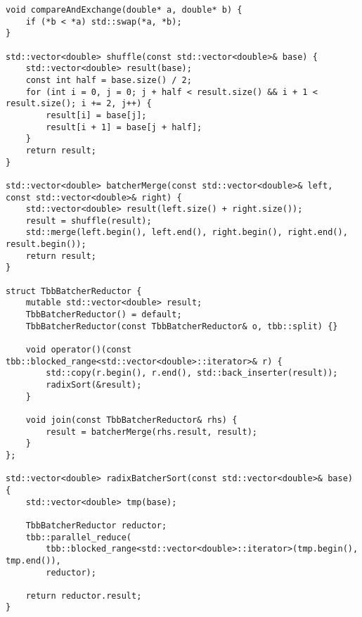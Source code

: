 \documentclass[12pt,a4paper]{article}
\begin{document}
\begin{lstlisting}
void compareAndExchange(double* a, double* b) {
    if (*b < *a) std::swap(*a, *b);
}

std::vector<double> shuffle(const std::vector<double>& base) {
    std::vector<double> result(base);
    const int half = base.size() / 2;
    for (int i = 0, j = 0; j + half < result.size() && i + 1 < result.size(); i += 2, j++) {
        result[i] = base[j];
        result[i + 1] = base[j + half];
    }
    return result;
}

std::vector<double> batcherMerge(const std::vector<double>& left, const std::vector<double>& right) {
    std::vector<double> result(left.size() + right.size());
    result = shuffle(result);
    std::merge(left.begin(), left.end(), right.begin(), right.end(), result.begin());
    return result;
}

struct TbbBatcherReductor {
    mutable std::vector<double> result;
    TbbBatcherReductor() = default;
    TbbBatcherReductor(const TbbBatcherReductor& o, tbb::split) {}

    void operator()(const tbb::blocked_range<std::vector<double>::iterator>& r) {
        std::copy(r.begin(), r.end(), std::back_inserter(result));
        radixSort(&result);
    }

    void join(const TbbBatcherReductor& rhs) {
        result = batcherMerge(rhs.result, result);
    }
};

std::vector<double> radixBatcherSort(const std::vector<double>& base) {
    std::vector<double> tmp(base);

    TbbBatcherReductor reductor;
    tbb::parallel_reduce(
        tbb::blocked_range<std::vector<double>::iterator>(tmp.begin(), tmp.end()),
        reductor);

    return reductor.result;
}
\end{lstlisting}
\end{document}
